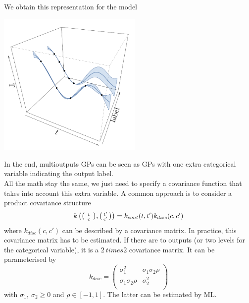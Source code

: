 \documentclass{beamer}
\newenvironment{psmallmatrix}
  {\left(\begin{smallmatrix}}
  {\end{smallmatrix}\right)}
\begin{document}
\begin{frame}{}
\begin{example}
	We obtain this representation for the model
	\begin{center}
	\includegraphics[height=7cm]{figures/R/ch2_multiGPR}
	\end{center}
\end{example}
\end{frame}


\begin{frame}{}
In the end, multioutputs GPs can be seen as GPs with one extra categorical variable indicating the output label.\\
\vspace{5mm}
All the math stay the same, we just need to specify a covariance function that takes into account this extra variable. A common approach is to consider a product covariance structure
\begin{equation*}
k\left( \begin{psmallmatrix} \phantom{'}t\phantom{'} \\ \phantom{'}c\phantom{'} \end{psmallmatrix},\begin{psmallmatrix} t' \\ c' \end{psmallmatrix} \right) = k_{cont}(t,t') k_{disc}(c,c')
\end{equation*}
where $k_{disc}(c,c')$ can be described by a covariance matrix. In practice, this covariance matrix has to be estimated. If there are to outputs (or two levels for the categorical variable), it is a $2 \ times 2$ covariance matrix. It can be parameterised by
\small
$$k_{disc} = 
\begin{pmatrix}
	\sigma_1^2 & \sigma_1 \sigma_2 \rho \\
	\sigma_1 \sigma_2 \rho & \sigma_2^2 \\
\end{pmatrix}$$
\normalsize
with  $\sigma_1,\ \sigma_2 \geq 0$ and $\rho \in [-1,1]$. The latter can be estimated by ML.
\vspace{5mm}

\end{frame}
\end{document}
